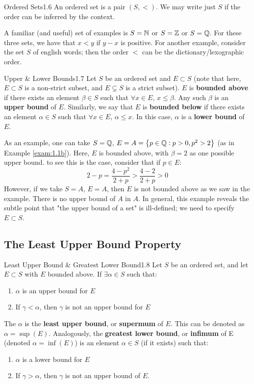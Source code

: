 \begin{definition}{Ordered Sets}{1.6}
    An ordered set is a pair $(S, <)$. We may write just $S$ if the order can be inferred by the context.
\end{definition}
A familiar (and useful) set of examples is $S = \mathbb{N}$ or $S = \mathbb{Z}$ or $S = \mathbb{Q}$. For these three sets, we have that $x < y$ if $y-x$ is positive. For another example, consider the set $S$ of english words; then the order $<$ can be the dictionary/lexographic order. 

\begin{definition}{Upper \& Lower Bounds}{1.7}
    Let $S$ be an ordered set and $E \subset S$ (note that here, $E \subset S$ is a non-strict subset, and $E \subsetneq S$ is a strict subset). $E$ is \textbf{bounded above} if there exists an element $\beta \in S$ such that $\forall x \in E$, $x \leq \beta$. Any such $\beta$ is an \textbf{upper bound} of $E$. Similarly, we say that $E$ is \textbf{bounded below} if there exists an element $\alpha \in S$ such that $\forall x \in E$, $\alpha \leq x$. In this case, $\alpha$ is a \textbf{lower bound} of $E$.
\end{definition}
As an example, one can take $S = \mathbb{Q}$, $E = A = \set{p \in \mathbb{Q}: p > 0, p^2 > 2}$ (as in Example \ref{exam:1.1b}). Here, $E$ is bounded above, with $\beta = 2$ as one possible upper bound. to see this is the case, consider that if $p \in E$:
\[2 - p = \frac{4 - p^2}{2+p} > \frac{4-2}{2+p} > 0\]
However, if we take $S = A$, $E = A$, then $E$ is not bounded above as we saw in the example. There is no upper bound of $A$ in $A$. In general, this example reveals the subtle point that "the upper bound of a set" is ill-defined; we need to specify $E \subset S$. 

\subsection{The Least Upper Bound Property}
\begin{definition}{Least Upper Bound \& Greatest Lower Bound}{1.8}
    Let $S$ be an ordered set, and let $E \subset S$ with $E$ bounded above. If $\exists \alpha \in S$ such that:
    \begin{enumerate}
        \item $\alpha$ is an upper bound for $E$
        \item If $\gamma < \alpha$, then $\gamma$ is not an upper bound for $E$
    \end{enumerate} 
    The $\alpha$ is the \textbf{least upper bound}, or \textbf{supermum} of $E$. This can be denoted as $\alpha = \sup(E)$. Analogously, the \textbf{greatest lower bound}, or \textbf{infimum} of E (denoted $\alpha = \inf(E)$) is an element $\alpha \in S$ (if it exists) such that:
    \begin{enumerate}
        \item $\alpha$ is a lower bound for $E$
        \item If $\gamma > \alpha$, then $\gamma$ is not an upper bound of $E$. 
    \end{enumerate}
\end{definition}

